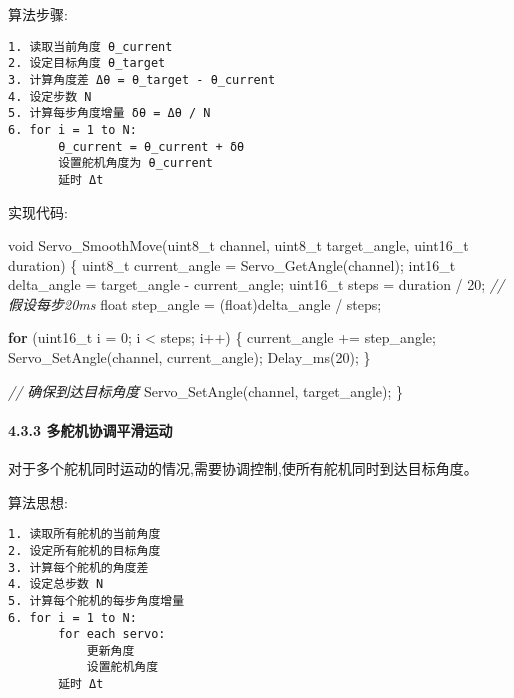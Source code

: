 \documentclass[
]{article}
\newenvironment{Shaded}{}{}
\newcommand{\CommentTok}[1]{\textcolor[rgb]{0.38,0.63,0.69}{\textit{#1}}}
\newcommand{\ControlFlowTok}[1]{\textcolor[rgb]{0.00,0.44,0.13}{\textbf{#1}}}
\newcommand{\DataTypeTok}[1]{\textcolor[rgb]{0.56,0.13,0.00}{#1}}
\newcommand{\DecValTok}[1]{\textcolor[rgb]{0.25,0.63,0.44}{#1}}
\newcommand{\NormalTok}[1]{#1}
\begin{document}
算法步骤:

\begin{verbatim}
1. 读取当前角度 θ_current
2. 设定目标角度 θ_target
3. 计算角度差 Δθ = θ_target - θ_current
4. 设定步数 N
5. 计算每步角度增量 δθ = Δθ / N
6. for i = 1 to N:
       θ_current = θ_current + δθ
       设置舵机角度为 θ_current
       延时 Δt
\end{verbatim}

实现代码:

\begin{Shaded}
\begin{Highlighting}[]
\DataTypeTok{void}\NormalTok{ Servo\_SmoothMove(}\DataTypeTok{uint8\_t}\NormalTok{ channel, }\DataTypeTok{uint8\_t}\NormalTok{ target\_angle, }\DataTypeTok{uint16\_t}\NormalTok{ duration)}
\NormalTok{\{}
    \DataTypeTok{uint8\_t}\NormalTok{ current\_angle = Servo\_GetAngle(channel);}
    \DataTypeTok{int16\_t}\NormalTok{ delta\_angle = target\_angle {-} current\_angle;}
    \DataTypeTok{uint16\_t}\NormalTok{ steps = duration / }\DecValTok{20}\NormalTok{;  }\CommentTok{// 假设每步20ms}
    \DataTypeTok{float}\NormalTok{ step\_angle = (}\DataTypeTok{float}\NormalTok{)delta\_angle / steps;}
    
    \ControlFlowTok{for}\NormalTok{ (}\DataTypeTok{uint16\_t}\NormalTok{ i = }\DecValTok{0}\NormalTok{; i \textless{} steps; i++) \{}
\NormalTok{        current\_angle += step\_angle;}
\NormalTok{        Servo\_SetAngle(channel, current\_angle);}
\NormalTok{        Delay\_ms(}\DecValTok{20}\NormalTok{);}
\NormalTok{    \}}
    
    \CommentTok{// 确保到达目标角度}
\NormalTok{    Servo\_SetAngle(channel, target\_angle);}
\NormalTok{\}}
\end{Highlighting}
\end{Shaded}

\hypertarget{ux591aux8235ux673aux534fux8c03ux5e73ux6ed1ux8fd0ux52a8}{%
\paragraph{4.3.3
多舵机协调平滑运动}\label{ux591aux8235ux673aux534fux8c03ux5e73ux6ed1ux8fd0ux52a8}}

对于多个舵机同时运动的情况,需要协调控制,使所有舵机同时到达目标角度。

算法思想:

\begin{verbatim}
1. 读取所有舵机的当前角度
2. 设定所有舵机的目标角度
3. 计算每个舵机的角度差
4. 设定总步数 N
5. 计算每个舵机的每步角度增量
6. for i = 1 to N:
       for each servo:
           更新角度
           设置舵机角度
       延时 Δt
\end{verbatim}
\end{document}
